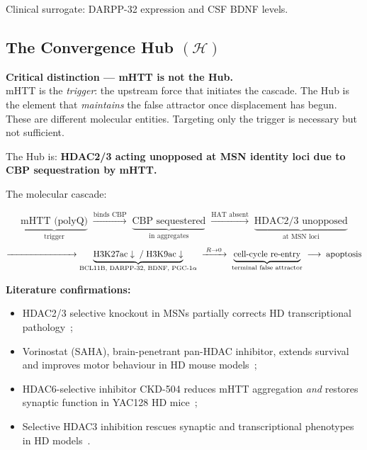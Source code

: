 \documentclass[12pt,a4paper]{article}
\newenvironment{warnenv}{%
  \begin{tcolorbox}[
    colback=red!5,
    colframe=warnbox,
    boxrule=1pt,
    arc=3pt,
    left=8pt, right=8pt,
    top=6pt, bottom=6pt,
    breakable
  ]
}{%
  \end{tcolorbox}
}
\newenvironment{derivenv}{%
  \begin{tcolorbox}[
    colback=lightgray,
    colframe=midgray,
    boxrule=0.5pt,
    arc=3pt,
    left=8pt, right=8pt,
    top=6pt, bottom=6pt,
    breakable
  ]
}{%
  \end{tcolorbox}
}
\newcommand{\Rratio}{R}
\newcommand{\Hub}{\mathcal{H}}
\begin{document}
Clinical surrogate: DARPP-32 expression and CSF BDNF levels.

\subsection{The Convergence Hub
\texorpdfstring{$(\Hub)$}{(H)}}

\begin{warnenv}
\textbf{Critical distinction --- mHTT is not the Hub.}\\
mHTT is the \emph{trigger}: the upstream force that
initiates the cascade. The Hub is the element that
\emph{maintains} the false attractor once displacement has
begun. These are different molecular entities. Targeting
only the trigger is necessary but not sufficient.
\end{warnenv}

\noindent The Hub is: \textbf{HDAC2/3 acting unopposed at
MSN identity loci due to CBP sequestration by mHTT.}

The molecular cascade:

\begin{derivenv}
\[
\underbrace{
  \text{mHTT (polyQ)}
}_{\text{trigger}}
\;\xrightarrow{\text{binds CBP}}\;
\underbrace{
  \text{CBP sequestered}
}_{\text{in aggregates}}
\;\xrightarrow{\text{HAT absent}}\;
\underbrace{
  \text{HDAC2/3 unopposed}
}_{\text{at MSN loci}}
\]
\[
\xrightarrow{\hphantom{\text{HDAC2/3 unopposed}}}
\underbrace{
  \mathrm{H3K27ac}\downarrow\;/\;\mathrm{H3K9ac}\downarrow
}_{\text{BCL11B, DARPP-32, BDNF, PGC-1}\alpha}
\;\xrightarrow{\;\Rratio\to 0\;}\;
\underbrace{
  \text{cell-cycle re-entry}
}_{\text{terminal false attractor}}
\;\longrightarrow\;
\text{apoptosis}
\]
\end{derivenv}

\noindent\textbf{Literature confirmations:}
\begin{itemize}
  \item HDAC2/3 selective knockout in MSNs partially
    corrects HD transcriptional pathology~\cite{eLife2020};
  \item Vorinostat (SAHA), brain-penetrant pan-HDAC
    inhibitor, extends survival and improves motor
    behaviour in HD mouse models~\cite{HDACiReview2020};
  \item HDAC6-selective inhibitor CKD-504 reduces mHTT
    aggregation \emph{and} restores synaptic function in
    YAC128 HD mice~\cite{CKD504_2023};
  \item Selective HDAC3 inhibition rescues synaptic and
    transcriptional phenotypes in HD models~\cite{HDAC3HD}.
\end{itemize}
\end{document}
